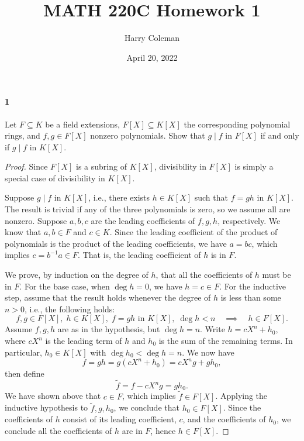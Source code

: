 \documentclass[12pt]{article}
\renewcommand{\maketitle}{\thispagestyle{title}}
\newlength{\myparskip}
\newenvironment{fullbox}{\begin{lrbox}{\savefullbox}\begin{minipage}{\dimexpr\textwidth-2\fboxsep\relax}\setlength{\parskip}{\myparskip}}{\end{minipage}\end{lrbox}\framebox[\textwidth]{\usebox{\savefullbox}}}
\newenvironment{pbox}[1][]{\begin{fullbox}\def\temp{#1}\ifx\temp\empty\else\paragraph{#1}\phantom{}\fi}{\end{fullbox}}
\theoremstyle{definition}
\newcommand{\<}{\langle}
\renewcommand{\>}{\rangle}
\newcommand{\seq}{\subseteq}
\begin{document}
\title{MATH 220C Homework 1}
\author{Harry Coleman}
\date{April 20, 2022}
\maketitle

\begin{pbox}[1]
    Let $F \seq K$ be a field extensions, $F[X] \seq K[X]$ the corresponding polynomial rings, and $f, g \in F[X]$ nonzero polynomials.
    Show that $g \mid f$ in $F[X]$ if and only if $g \mid f$ in $K[X]$.
\end{pbox}

\begin{proof}
    Since $F[X]$ is a subring of $K[X]$, divisibility in $F[X]$ is simply a special case of divisibility in $K[X]$.

    Suppose $g \mid f$ in $K[X]$, i.e., there exists $h \in K[X]$ such that $f = gh$ in $K[X]$.
    The result is trivial if any of the three polynomials is zero, so we assume all are nonzero.
    Suppose $a, b, c$ are the leading coefficients of $f, g, h$, respectively.
    We know that $a, b \in F$ and $c \in K$.
    Since the leading coefficient of the product of polynomials is the product of the leading coefficients, we have $a = bc$, which implies $c = b^{-1}a \in F$.
    That is, the leading coefficient of $h$ is in $F$.

    We prove, by induction on the degree of $h$, that all the coefficients of $h$ must be in $F$.
    For the base case, when $\deg h = 0$, we have $h = c \in F$.
    For the inductive step, assume that the result holds whenever the degree of $h$ is less than some $n > 0$, i.e., the following holds:
    \[
        f, g \in F[X],\; h \in K[X],\; f = gh \text{ in } K[X],\; \deg h < n \quad\implies\quad h \in F[X].
    \]
    Assume $f, g, h$ are as in the hypothesis, but $\deg h = n$.
    Write $h = cX^n + h_0$, where $cX^n$ is the leading term of $h$ and $h_0$ is the sum of the remaining terms.
    In particular, $h_0 \in K[X]$ with $\deg h_0 < \deg h = n$.
    We now have
    \[
        f = gh = g(cX^n + h_0) = cX^ng + gh_0,
    \]
    then define
    \[
        \tilde{f} = f - cX^ng = gh_0.
    \]
    We have shown above that $c \in F$, which implies $\tilde{f} \in F[X]$.
    Applying the inductive hypothesis to $\tilde{f}, g, h_0$, we conclude that $h_0 \in F[X]$.
    Since the coefficients of $h$ consist of its leading coefficient, $c$, and the coefficients of $h_0$, we conclude all the coefficients of $h$ are in $F$, hence $h \in F[X]$.
\end{proof}
\end{document}
